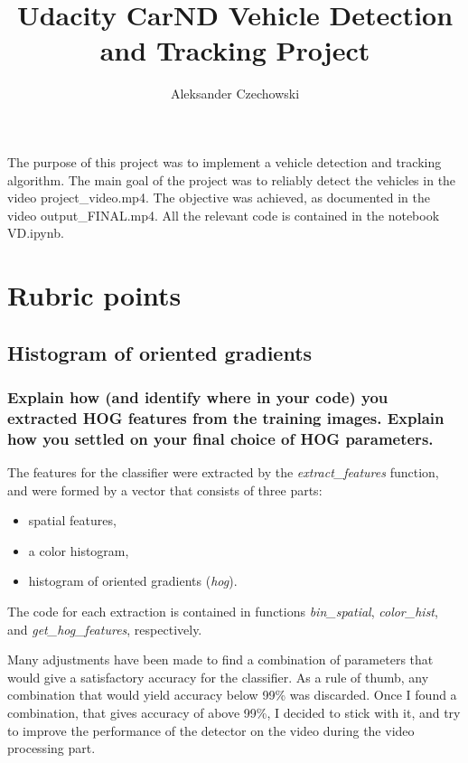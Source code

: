 \documentclass[a4paper,10pt]{article}
\begin{document}
\pagestyle{empty}
\noindent

\title{Udacity CarND Vehicle Detection and Tracking Project}
\author{Aleksander Czechowski}
\maketitle

The purpose of this project was to implement a vehicle detection and tracking algorithm.
The main goal of the project was to reliably detect the vehicles in the video project\_video.mp4.
The objective was achieved, as documented in the video output\_FINAL.mp4.
All the relevant code is contained in the notebook VD.ipynb.

\section{Rubric points}

\subsection{Histogram of oriented gradients}

\subsubsection{Explain how (and identify where in your code) you extracted HOG features from the training images. Explain how you settled on your final choice of HOG parameters.}

The features for the classifier were extracted by the \emph{extract\_features} function,
and were formed by a vector that consists of three parts:
%
\begin{itemize}
  \item spatial features,
  \item a color histogram,
  \item histogram of oriented gradients (\emph{hog}).
\end{itemize}

The code for each extraction is contained in functions 
\emph{bin\_spatial}, \emph{color\_hist}, and \emph{get\_hog\_features}, respectively.

Many adjustments have been made to find a combination of parameters that would give a satisfactory accuracy for the classifier.
As a rule of thumb, any combination that would yield accuracy below 99\% was discarded.
Once I found a combination, that gives accuracy of above 99\%, I decided to stick with it,
and try to improve the performance of the detector on the video during the video processing part.
\end{document}

